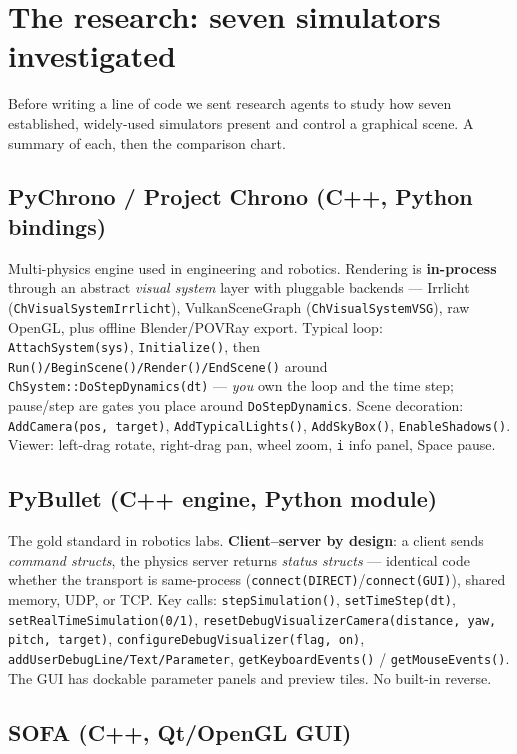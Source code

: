 \documentclass[11pt]{article}
\newcommand{\code}[1]{\texttt{#1}}
\begin{document}
\section{The research: seven simulators investigated}

Before writing a line of code we sent research agents to study how
seven established, widely-used simulators present and control a
graphical scene. A summary of each, then the comparison chart.

\subsection{PyChrono / Project Chrono (C++, Python bindings)}

Multi-physics engine used in engineering and robotics. Rendering is
\textbf{in-process} through an abstract \emph{visual system} layer
with pluggable backends --- Irrlicht
(\code{ChVisualSystemIrrlicht}), VulkanSceneGraph
(\code{ChVisualSystemVSG}), raw OpenGL, plus offline Blender/POVRay
export. Typical loop: \code{AttachSystem(sys)}, \code{Initialize()},
then \code{Run()/BeginScene()/Render()/EndScene()} around
\code{ChSystem::DoStepDynamics(dt)} --- \emph{you} own the loop and
the time step; pause/step are gates you place around
\code{DoStepDynamics}. Scene decoration: \code{AddCamera(pos,
target)}, \code{AddTypicalLights()}, \code{AddSkyBox()},
\code{EnableShadows()}. Viewer: left-drag rotate, right-drag pan,
wheel zoom, \code{i} info panel, Space pause.

\subsection{PyBullet (C++ engine, Python module)}

The gold standard in robotics labs. \textbf{Client--server by
design}: a client sends \emph{command structs}, the physics server
returns \emph{status structs} --- identical code whether the transport
is same-process (\code{connect(DIRECT)}/\code{connect(GUI)}), shared
memory, UDP, or TCP. Key calls: \code{stepSimulation()},
\code{setTimeStep(dt)}, \code{setRealTimeSimulation(0/1)},
\code{resetDebugVisualizerCamera(distance, yaw, pitch, target)},
\code{configureDebugVisualizer(flag, on)},
\code{addUserDebugLine/Text/Parameter},
\code{getKeyboardEvents()} / \code{getMouseEvents()}. The GUI has
dockable parameter panels and preview tiles. No built-in reverse.

\subsection{SOFA (C++, Qt/OpenGL GUI)}
\end{document}
